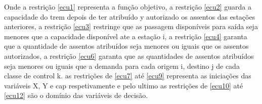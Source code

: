 \documentclass[10pt,a4paper]{article}
\begin{document}
Onde a restrição \ref{ecu1} representa a função objetivo, a restrição \ref{ecu2} guarda a capacidade do trem depois
de ter atribuído y autorizado os assentos das estações anteriores, a restrição \ref{ecu3} restringe que as passagem disponíveis para
saída seja menores que a capacidade disponível ate a estação i, a restrição \ref{ecu4} garanta que a quantidade de assentos atribuídos
seja menores ou iguais que os assentos autorizados, a restrição \ref{ecu6} garanta que as quantidades de assentos atribuídos seja menores
ou iguais que a demanda para cada origem i, destino j de cada classe de control k. as restrições de \ref{ecu7} até \ref{ecu9} representa
as iniciações das variáveis X, Y e cap respetivamente e pelo ultimo as restrições de \ref{ecu10} até \ref{ecu12} são o domínio das variáveis de decisão.
\\ \\
\end{document}

